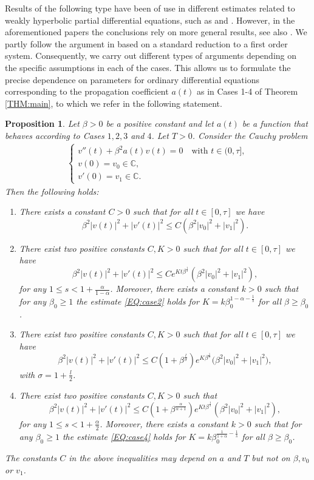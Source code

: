 \documentclass[12pt,oneside,a4paper]{book}
\numberwithin{equation}{section}     %
\theoremstyle{plain}
\newtheorem{proposition}[theorem]{Proposition}
\theoremstyle{definition}
\newcommand{\C}{{\mathbb C}}
\begin{document}
Results of the following type have been of use in different estimates related to weakly hyperbolic partial differential equations, such as \cite{CK2002} and \cite{GR2015}. However, in the aforementioned papers the conclusions rely on more general results, see also \cite{GR2012}. We partly follow the argument in \cite{GR2015} based on a standard reduction to a first order system. Consequently, we carry out different types of arguments depending on the specific assumptions in each of the cases. This allows us to formulate the precise dependence on parameters for ordinary differential equations corresponding to the propagation coefficient $a(t)$ as in Cases 1-4 of Theorem \ref{THM:main}, to which we refer in the following statement.
\begin{proposition}\label{lemma}
	Let $\beta>0$ be a positive constant and let $a(t)$ be a function that behaves according to Cases $1,2,3$ and $4$. Let $T>0$. Consider the Cauchy problem
	\begin{align}\label{ODE}
	\begin{cases}
	v''(t)+\beta^2 a(t)v(t)=0\quad\text{with }t\in(0,\tau],\\
	v(0)=v_0\in\C,\\
	v'(0)=v_1\in\C.
	\end{cases}
	\end{align}  
	Then the following holds: 
	\begin{enumerate}
		\item There exists a constant $C>0$ such that for all $t\in [0,\tau]$ we have
		\[
		\beta^2|v(t)|^2+|v'(t)|^2\leq C(\beta^2|v_0|^2+|v_1|^2).
		\]
		\item There exist two positive constants $C,K>0$ such that for all $t\in [0,\tau]$ we have
		\begin{equation}\label{EQ:case2}
		\beta^2|v(t)|^2+|v'(t)|^2\leq Ce^{Kt \beta^{\frac{1}{s}}}(\beta^2|v_0|^2+|v_1|^2),
		\end{equation} 
		for any
		$1\leq s < 1+\frac{\alpha}{1-\alpha}$. Moreover, there exists a constant $k>0$ such that
		for any $\beta_0\geq 1$ the estimate \eqref{EQ:case2} holds for $K= k\beta_0^{1-\alpha-\frac1s}$ for all $\beta\geq \beta_0$.
		\item There exist two positive constants $C,K>0$ such that for all $t\in [0,\tau]$ we have
		\[
		\beta^2|v(t)|^2+|v'(t)|^2\leq C(1+\beta^\frac{l}{\sigma})e^{K\beta^\frac{1}{\sigma}}\big(\beta^2|v_0|^2+|v_1|^2\big),
		\]
		with $\sigma= 1+\frac{l}{2}$. 
		\item There exist two positive constants $C,K>0$ such that 
		\begin{equation}\label{EQ:case4}
		\beta^2|v(t)|^2+|v'(t)|^2\leq C(1+\beta^\frac{\alpha}{\alpha+1})e^{Kt\beta^\frac{1}{s}}(\beta^2|v_0|^2+|v_1|^2),
		\end{equation} 
		for any $1\leq s<1+\frac{\alpha}{2}$.
		Moreover, there exists a constant $k>0$ such that
		for any $\beta_0\geq 1$ the estimate \eqref{EQ:case4} holds for $K= k\beta_0^{\frac{1}{1+\alpha}-\frac1s}$ for all $\beta\geq \beta_0$.
	\end{enumerate}
	The constants $C$ in the above inequalities may depend on $a$ and $T$ but not on $\beta, v_0$ or $v_1$.
\end{proposition}
\end{document}
